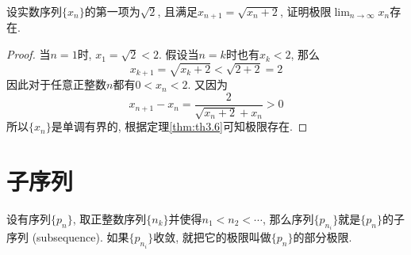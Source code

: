 \documentclass[cn,12pt,math=mtpro2,citestyle=gb7714-2015,bibstyle=gb7714-2015,twocol]{elegantbook}
\newcommand{\limn}{\lim_{n\to\infty}}
\begin{document}
\begin{example}
设实数序列$\{x_n\}$的第一项为$\sqrt{2}$, 且满足$x_{n+1}=\sqrt{x_n+2}$, 证明极限$\limn x_n$存在.
\end{example}
\begin{proof}
  当$n=1$时, $x_1=\sqrt{2}<2$. 假设当$n=k$时也有$x_k<2$, 那么
  $$x_{k+1}=\sqrt{x_k+2}<\sqrt{2+2}=2$$
  因此对于任意正整数$n$都有$0<x_n<2$. 又因为
  $$x_{n+1}-x_n=\frac{2}{\sqrt{x_n+2}+x_n}>0$$
  所以$\{x_n\}$是单调有界的, 根据定理\ref{thm:th3.6}可知极限存在.
\end{proof}

\section{子序列}
\begin{definition}\label{def:def3.1}
设有序列$\{p_n\}$, 取正整数序列$\{n_k\}$并使得$n_1<n_2<\cdots$, 那么序列$\{p_{n_i}\}$就是$\{p_n\}$的子序列 (subsequence). 如果$\{p_{n_i}\}$收敛, 就把它的极限叫做$\{p_n\}$的部分极限.
\end{definition}
\end{document}
